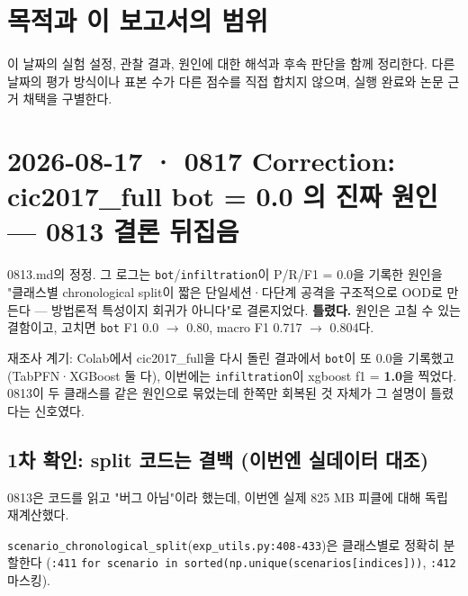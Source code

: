 




\section*{목적과 이 보고서의 범위}

이 날짜의 실험 설정, 관찰 결과, 원인에 대한 해석과 후속 판단을 함께 정리한다. 다른 날짜의 평가 방식이나 표본 수가 다른 점수를 직접 합치지 않으며, 실행 완료와 논문 근거 채택을 구별한다.


\section{2026-08-17 · 0817 Correction: cic2017\_\allowbreak{}full bot =\allowbreak{} 0.0 의 진짜 원인 — 0813 결론 뒤집음}
\label{report:20260817_0817}
0813.md의 정정. 그 로그는 \texttt{bot}/\allowbreak{}\texttt{infiltra\allowbreak{}tion}이 P/\allowbreak{}R/\allowbreak{}F1 =\allowbreak{} 0.0을 기록한 원인을 "클래스별 chronological split이 짧은 단일세션·다단계 공격을 구조적으로 OOD로 만든다 — 방법론적 특성이지 회귀가 아니다"로 결론지었다. \textbf{틀렸다.} 원인은 고칠 수 있는 결함이고, 고치면 \texttt{bot} F1 0.0  \ensuremath{\rightarrow}  0.80, macro F1 0.717  \ensuremath{\rightarrow}  0.804다.

재조사 계기: Colab에서 cic2017\_\allowbreak{}full을 다시 돌린 결과에서 \texttt{bot}이 또 0.0을 기록했고(TabPFN·XGBoost 둘 다), 이번에는 \texttt{infiltra\allowbreak{}tion}이 xgboost f1 =\allowbreak{} \textbf{1.0}을 찍었다. 0813이 두 클래스를 같은 원인으로 묶었는데 한쪽만 회복된 것 자체가 그 설명이 틀렸다는 신호였다.

\subsection{1차 확인: split 코드는 결백 (이번엔 실데이터 대조)}
0813은 코드를 읽고 "버그 아님"이라 했는데, 이번엔 실제 825 MB 피클에 대해 독립 재계산했다.

\par\noindent \textbullet\enspace \texttt{scenario\allowbreak{}\_\allowbreak{}\allowbreak{}chronol\allowbreak{}ogical\_\allowbreak{}\allowbreak{}s\allowbreak{}plit}(\texttt{exp\_\allowbreak{}\allowbreak{}util\allowbreak{}s.\allowbreak{}py:408\allowbreak{}-\allowbreak{}433})은 클래스별로 정확히 분할한다 (\texttt{:411} \texttt{for scen\allowbreak{}ario in \allowbreak{}sorted(n\allowbreak{}p.\allowbreak{}unique\allowbreak{}(scenari\allowbreak{}os[indic\allowbreak{}es]))}, \texttt{:412} 마스킹).


